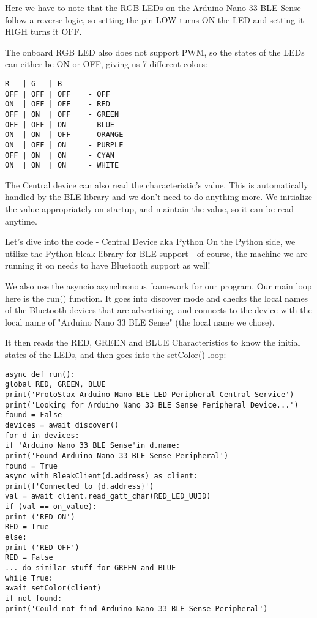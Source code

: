 Here we have to note that the RGB LEDs on the Arduino Nano 33 BLE Sense follow a reverse logic, so setting the pin LOW turns ON the LED and setting it HIGH turns it OFF.

The onboard RGB LED also does not support PWM, so the states of the LEDs can either be ON or OFF, giving us 7 different colors:

\begin{lstlisting}
R   | G   | B
OFF | OFF | OFF    - OFF
ON  | OFF | OFF    - RED
OFF | ON  | OFF    - GREEN
OFF | OFF | ON     - BLUE
ON  | ON  | OFF    - ORANGE
ON  | OFF | ON     - PURPLE
OFF | ON  | ON     - CYAN
ON  | ON  | ON     - WHITE
\end{lstlisting}

The Central device can also read the characteristic's value. This is automatically handled by the BLE library and we don't need to do anything more. We initialize the value appropriately on startup, and maintain the value, so it can be read anytime.

Let's dive into the code - Central Device aka Python
On the Python side, we utilize the Python bleak library for BLE support - of course, the machine we are running it on needs to have Bluetooth support as well!

We also use the asyncio asynchronous framework for our program. Our main loop here is the run() function. It goes into discover mode and checks the local names of the Bluetooth devices that are advertising, and connects to the device with the local name of "Arduino Nano 33 BLE Sense" (the local name we chose).

It then reads the RED, GREEN and BLUE Characteristics to know the initial states of the LEDs, and then goes into the setColor() loop:

\begin{lstlisting}
async def run():
global RED, GREEN, BLUE
print('ProtoStax Arduino Nano BLE LED Peripheral Central Service')
print('Looking for Arduino Nano 33 BLE Sense Peripheral Device...')
found = False
devices = await discover()
for d in devices: 
if 'Arduino Nano 33 BLE Sense'in d.name:
print('Found Arduino Nano 33 BLE Sense Peripheral')
found = True
async with BleakClient(d.address) as client:
print(f'Connected to {d.address}')
val = await client.read_gatt_char(RED_LED_UUID)
if (val == on_value):
print ('RED ON')
RED = True
else:
print ('RED OFF')
RED = False
... do similar stuff for GREEN and BLUE
while True:
await setColor(client)
if not found:
print('Could not find Arduino Nano 33 BLE Sense Peripheral')
\end{lstlisting}


